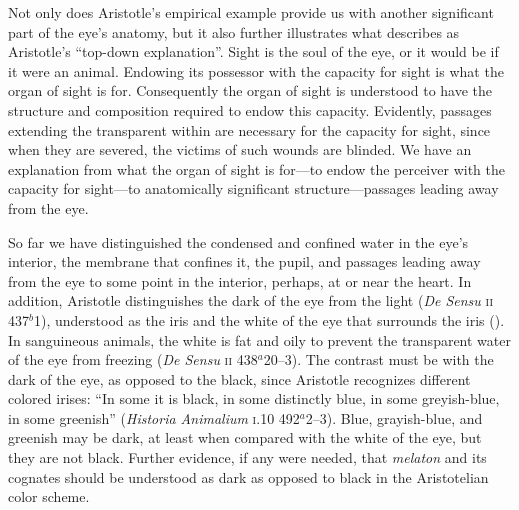 Not only does Aristotle's empirical example provide us with another significant part of the eye's anatomy, but it also further illustrates what \citet{Johansen:1997zr} describes as Aristotle's ``top-down explanation''. Sight is the soul of the eye, or it would be if it were an animal. Endowing its possessor with the capacity for sight is what the organ of sight is for. Consequently the organ of sight is understood to have the structure and composition required to endow this capacity. Evidently, passages extending the transparent within are necessary for the capacity for sight, since when they are severed, the victims of such wounds are blinded. We have an explanation from what the organ of sight is for---to endow the perceiver with the capacity for sight---to anatomically significant structure---passages leading away from the eye.

So far we have distinguished the condensed and confined water in the eye's interior, the membrane that confines it, the pupil, and passages leading away from the eye to some point in the interior, perhaps, at or near the heart. In addition, Aristotle distinguishes the dark of the eye from the light (\emph{De Sensu} \textsc{ii} 437\( ^{b} \)1), understood as the iris and the white of the eye that surrounds the iris (\citealt[see][218, 231 n13]{Lloyd:1978fk}). In sanguineous animals, the white is fat and oily to prevent the transparent water of the eye from freezing (\emph{De Sensu} \textsc{ii} 438\( ^{a} \)20--3). The contrast must be with the dark of the eye, as opposed to the black, since Aristotle recognizes different colored irises: ``In some it is black, in some distinctly blue, in some greyish-blue, in some greenish'' (\emph{Historia Animalium} \textsc{i}.10 492\( ^{a} \)2--3). Blue, grayish-blue, and greenish may be dark, at least when compared with the white of the eye, but they are not black. Further evidence, if any were needed, that \emph{melaton} and its cognates should be understood as dark as opposed to black in the Aristotelian color scheme.

